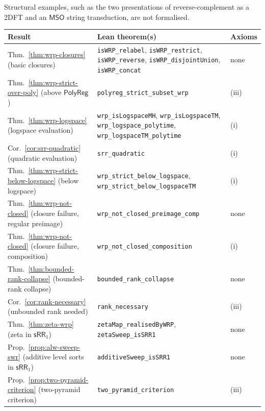 \documentclass[11pt]{article}
\theoremstyle{definition}
\newcommand{\SWR}{\mathsf{sRR}_1}
\newcommand{\MSO}{\mathsf{MSO}}
\newcommand{\polyreg}{\mathsf{PolyReg}}
\begin{document}
Structural examples, such as the two presentations of reverse-complement as a
2DFT and an $\MSO$ string transduction, are not formalised.

\begin{table}[t]
\centering
\footnotesize
\renewcommand{\arraystretch}{1.25}
\begin{tabularx}{\textwidth}{@{}>{\raggedright\arraybackslash}p{}
                                   >{\raggedright\arraybackslash}X
                                   >{\raggedright\arraybackslash}p{}@{}}
\toprule
Result & Lean theorem(s) & Axioms \\
\midrule
Thm.~\ref{thm:wrp-closures} (basic closures) &
  \texttt{isWRP\_relabel}, \texttt{isWRP\_restrict},
  \texttt{isWRP\_reverse}, \texttt{isWRP\_disjointUnion},
  \texttt{isWRP\_concat} & none \\
Thm.~\ref{thm:wrp-strict-over-poly} (above $\polyreg$) &
  \texttt{polyreg\_strict\_subset\_wrp} & (iii) \\
Thm.~\ref{thm:wrp-logspace} (logspace evaluation) &
  \texttt{wrp\_isLogspaceMH}, \texttt{wrp\_isLogspaceTM},
  \texttt{wrp\_logspace\_polytime}, \texttt{wrp\_logspaceTM\_polytime} &
  (i) \\
Cor.~\ref{cor:srr-quadratic} (quadratic evaluation) &
  \texttt{srr\_quadratic} & (i) \\
Thm.~\ref{thm:wrp-strict-below-logspace} (below logspace) &
  \texttt{wrp\_strict\_below\_logspace},
  \texttt{wrp\_strict\_below\_logspaceTM} & (i) \\
Thm.~\ref{thm:wrp-not-closed} (closure failure, regular preimage) &
  \texttt{wrp\_not\_closed\_preimage\_comp} & none \\
Thm.~\ref{thm:wrp-not-closed} (closure failure, composition) &
  \texttt{wrp\_not\_closed\_composition} & (i) \\
Thm.~\ref{thm:bounded-rank-collapse} (bounded-rank collapse) &
  \texttt{bounded\_rank\_collapse} & none \\
Cor.~\ref{cor:rank-necessary} (unbounded rank needed) &
  \texttt{rank\_necessary} & (iii) \\
Thm.~\ref{thm:zeta-wrp} (zeta in $\SWR$) &
  \texttt{zetaMap\_realisedByWRP}, \texttt{zetaSweep\_isSRR1} & none \\
Prop.~\ref{prop:alw-sweep-swr} (additive level sorts in $\SWR$) &
  \texttt{additiveSweep\_isSRR1} & none \\
Prop.~\ref{prop:two-pyramid-criterion} (two-pyramid criterion) &
  \texttt{two\_pyramid\_criterion} & (iii) \\

\end{tabularx}
\end{table}
\end{document}
